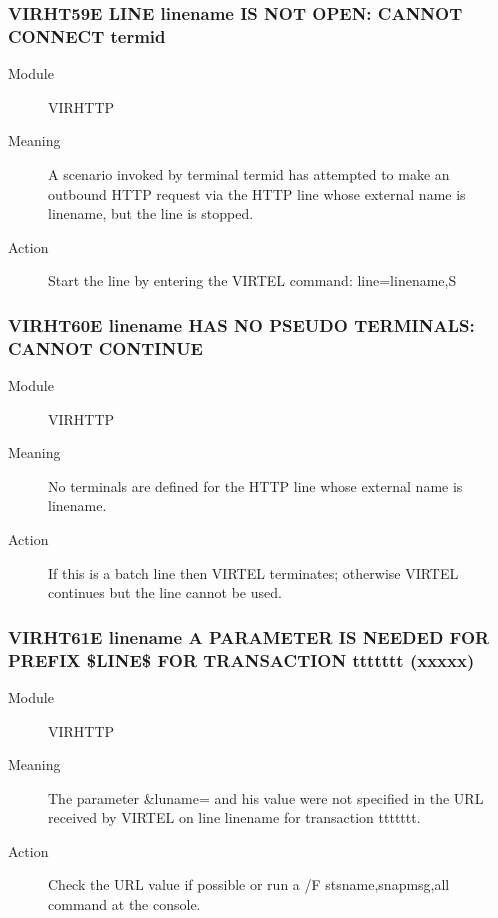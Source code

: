\documentclass[letterpaper,10pt,english]{sphinxmanual}
\begin{document}
\subsubsection{VIRHT59E LINE linename IS NOT OPEN: CANNOT CONNECT termid}
\label{\detokenize{messages:virht59e-line-linename-is-not-open-cannot-connect-termid}}\begin{description}
\item[{Module}] \leavevmode
VIRHTTP

\item[{Meaning}] \leavevmode
A scenario invoked by terminal termid has attempted to make an outbound HTTP request via the HTTP line whose external name is linename, but the line is stopped.

\item[{Action}] \leavevmode
Start the line by entering the VIRTEL command: line=linename,S

\end{description}


\subsubsection{VIRHT60E linename HAS NO PSEUDO TERMINALS: CANNOT CONTINUE}
\label{\detokenize{messages:virht60e-linename-has-no-pseudo-terminals-cannot-continue}}\begin{description}
\item[{Module}] \leavevmode
VIRHTTP

\item[{Meaning}] \leavevmode
No terminals are defined for the HTTP line whose external name is linename.

\item[{Action}] \leavevmode
If this is a batch line then VIRTEL terminates; otherwise VIRTEL continues but the line cannot be used.

\end{description}


\subsubsection{VIRHT61E linename A PARAMETER IS NEEDED FOR PREFIX \$LINE\$ FOR TRANSACTION ttttttt (xxxxx)}
\label{\detokenize{messages:virht61e-linename-a-parameter-is-needed-for-prefix-line-for-transaction-ttttttt-xxxxx}}\begin{description}
\item[{Module}] \leavevmode
VIRHTTP

\item[{Meaning}] \leavevmode
The parameter \&luname= and his value were not specified in the URL received by VIRTEL on line linename for transaction ttttttt.

\item[{Action}] \leavevmode
Check the URL value if possible or run a /F stsname,snapmsg,all command at the console.

\end{description}
\end{document}
